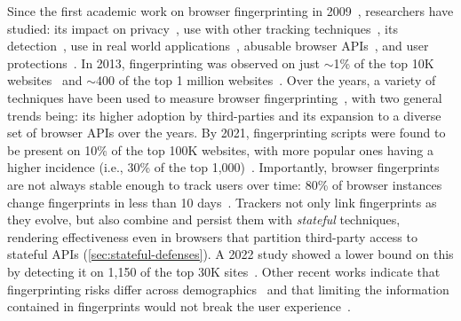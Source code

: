 Since the first academic work on browser fingerprinting in 2009~\cite{mayerAnyPersonPamphleteer2009}, researchers have studied: its impact on privacy~\cite{eckersleyHowUniqueYour2010}, use with other tracking techniques~\cite{fouadMyCookiePhoenix2022}, its detection~\cite{iqbalFingerprintingFingerprintersLearning2021, boussahaFPtracerFinegrainedBrowser2024}, use in real world applications~\cite{aminazadWebRunner20492020, wuHimManyFaces2023}, abusable browser APIs~\cite{bahramiFPRadarLongitudinalMeasurement2022, suAutomaticDiscoveryEmerging2023, senolDoubleEdgedSword2024}, and user protections~\cite{vastelFpScannerPrivacyImplications2018}. 
%
In 2013, fingerprinting was observed on just $\sim$1\% of the top 10K websites~\cite{nikiforakisCookielessMonsterExploring2013} and $\sim$400 of the top 1 million websites~\cite{acarFPDetectiveDustingWeb2013}. 
%
Over the years, a variety of techniques have been used to measure browser fingerprinting~\cite{acarWebNeverForgets2014,englehardtOnlineTracking1millionsite2016,olejnikBatteryStatusNot2017,dasWebsSixthSense2018}, with two general trends being: its higher adoption by third-parties and its expansion to a diverse set of browser APIs over the years. 
%
By 2021, fingerprinting scripts were found to be present on 10\% of the top 100K websites, with more popular ones having a higher incidence (i.e., 30\% of the top 1,000)~\cite{iqbalFingerprintingFingerprintersLearning2021}.
%
Importantly, browser fingerprints are not always stable enough to track users over time: 80\% of browser instances change fingerprints in less than 10 days~\cite{vastelFPSTALKERTrackingBrowser2018}. 
%
Trackers not only link fingerprints as they evolve, but also combine and persist them with \textit{stateful} techniques, rendering effectiveness even in browsers that partition third-party access to stateful APIs (\autoref{sec:stateful-defenses}). 
%
A 2022 study showed a lower bound on this by detecting it on 1,150 of the top 30K sites~\cite{fouadMyCookiePhoenix2022}.
%
Other recent works indicate that fingerprinting risks differ across demographics~\cite{berkeHowUniqueWhose2025} and that limiting the information contained in fingerprints would not break the user experience~\cite{intumwayaseUARadarExploringImpact2023}.



